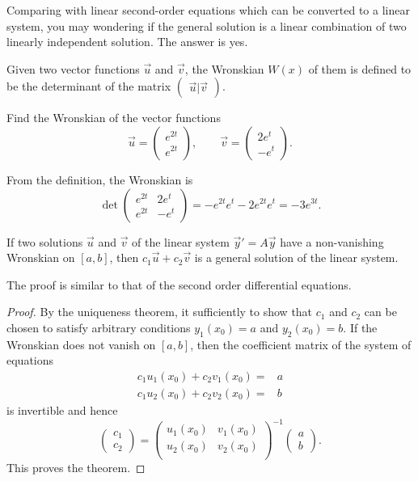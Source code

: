 Comparing with linear second-order equations which can be converted to a linear system, you may wondering if the general solution is a linear combination of two linearly independent solution. The answer is yes.

Given two vector functions $\vec{u}$ and $\vec{v}$, the Wronskian $W(x)$ of them is defined to be the determinant of the matrix $\begin{pmatrix}
  \vec{u} | \vec{v}
\end{pmatrix}$.

\begin{example}
  Find the Wronskian of the vector functions
  \[
  \vec{u}=\begin{pmatrix}
    e^{2t} \\  e^{2t}
  \end{pmatrix},  \qquad
  \vec{v}=\begin{pmatrix}
    2e^t \\ -e^t
  \end{pmatrix}.
  \]
\end{example}
\begin{solution}
  From the definition, the Wronskian is
  \[
  \det\begin{pmatrix}
    e^{2t} & 2e^t\\
    e^{2t} & -e^t
  \end{pmatrix}=-e^{2t}e^{t}-2e^{2t}e^t=-3e^{3t}.  
  \]
\end{solution}

\begin{theorem}
  If two solutions $\vec{u}$ and $\vec{v}$ of the linear system $\vec{y}'=A\vec{y}$ have a non-vanishing Wronskian on $[a, b]$, then $c_1\vec{u}+c_2\vec{v}$ is a general solution of the linear system.
\end{theorem}
The proof is similar to that of the second order differential equations.
\begin{proof}
  By the uniqueness theorem, it sufficiently to show that $c_1$ and $c_2$ can be chosen to satisfy arbitrary conditions $y_1(x_0)=a$ and $y_2(x_0)=b$.
  If the Wronskian does not vanish on $[a, b]$, then the coefficient matrix of the system of equations
\[
  \begin{aligned}
    c_1 u_1(x_0) + c_2 v_1(x_0)= &a\\ 
    c_1 u_2(x_0) + c_2 v_2(x_0)= &b 
  \end{aligned}
\]
is invertible and hence 
\[
\begin{pmatrix}
  c_1 \\ c_2
\end{pmatrix}=\begin{pmatrix}
  u_1(x_0) & v_1(x_0)\\
  u_2(x_0) & v_2(x_0)\\
\end{pmatrix}^{-1}  \begin{pmatrix}
  a \\ b
\end{pmatrix}.
\]
This proves the theorem.
\end{proof}


